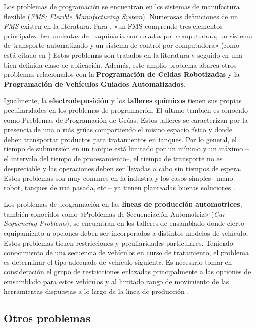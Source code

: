 \documentclass[spanish,draft,12pt,headsepline,footsepline,paper=letter]{scrreprt}
\begin{document}
Los problemas de programación se encuentran en los sistemas de manufactura flexible (\textit{FMS; Flexible Manufacturing System}). Numerosas definiciones de un \textit{FMS} existen en la literatura. Para \citet{liu1996classification}, «un FMS comprende tres elementos principales: herramientas de maquinaria controladas por computadora; un sistema de transporte automatizado y un sistema de control por computadora» (como está citado en \citealp[p.~6]{TKindt2002})  Estos problemas son tratados en la literatura y seguido en una bien definida clase de aplicación. Además, este amplio problema abarca otros problemas relacionados con la \textbf{Programación de Celdas Robotizadas} y la \textbf{Programación de Vehículos Guiados Automatizados}.

Igualmente, la \textbf{electrodeposición} y los \textbf{talleres químicos} tienen sus propias peculiaridades en los problemas de programación. El último también es conocido como Problemas de Programación de Grúas. Estos talleres se caracterizan por la presencia de una o más grúas compartiendo el mismo espacio físico y donde deben transportar productos para tratamientos en tanques. Por lo general, el tiempo de submersión en un tanque está limitado por un mínimo y un máximo –el intervalo del tiempo de procesamiento–, el tiempo de transporte no es despreciable y las operaciones deben ser llevadas a cabo sin tiempos de espera. Estos problemas son muy comunes en la industra y los casos simples –mono-robot, tanques de una pasada, etc.– ya tienen planteadas buenas soluciones \citep[p.~6,~7]{TKindt2002}.

Los problemas de programación en las \textbf{líneas de producción automotrices}, también conocidos como «Problemas de Secuenciación Automotriz» (\textit{Car Sequencing Problems}), se encuentran en los talleres de ensamblado donde cierto equipamiento u opciones deben ser incorporados a distintos modelos de vehículo. Estos problemas tienen restricciones y peculiaridades particulares. Teniendo conocimiento de una secuencia de vehículos en curso de tratamiento, el problema es determinar el tipo adecuado de vehículo siguiente. Es necesario tomar en consideración el grupo de restricciones enlazadas principalmente a las opciones de emsamblado para estos vehículos y al limitado rango de movimiento de las herramientas dispuestas a lo largo de la línea de producción \citep[p.~7]{TKindt2002}.

\subsection{Otros problemas}
\label{otros_problemas}
\end{document}
